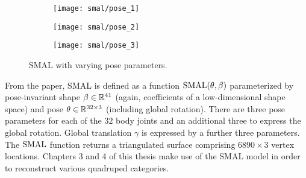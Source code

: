     \begin{figure}[H]
    \centering
    \begin{subfigure}{0.3\linewidth}
    \centering
        \texttt{[image: smal/pose\_1]}
    \end{subfigure}%
    \begin{subfigure}{0.3\linewidth}
    \centering
        \texttt{[image: smal/pose\_2]}
    \end{subfigure}%
    \begin{subfigure}{0.3\linewidth}
        \centering
            \texttt{[image: smal/pose\_3]}
    \end{subfigure}%
    \caption{SMAL with varying pose parameters.}
    \label{fig:smal_model_poses}
\end{figure}

From the paper, SMAL is defined as a function $\operatorname{SMAL}(\theta, \beta)$ parameterized by pose-invariant shape $\beta \in {\mathbb{R}^{41}}$ (again, coefficients of a low-dimensional shape space) and pose $\theta \in {\mathbb{R}^{32 \times 3}}$ (including global rotation). There are three pose parameters for each of the $32$ body joints and an additional three to express the global rotation. Global translation $\gamma$ is expressed by a further three parameters. The $\operatorname{SMAL}$ function returns a triangulated surface comprising $6890 \times 3$ vertex locations. Chapters 3 and 4 of this thesis make use of the SMAL model in order to reconstruct various quadruped categories.
